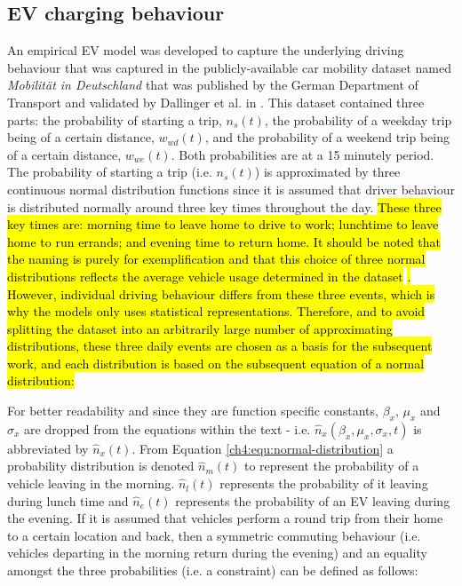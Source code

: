 \subsection{EV charging behaviour}
\label{ch4:subsec:ev-charging-behaviour}


An empirical EV model was developed to capture the underlying driving behaviour that was captured in the publicly-available car mobility dataset named \textit{Mobilit\"{a}t in Deutschland} that was published by the German Department of Transport \cite{MiD2008} and validated by Dallinger et al. in \cite{Dallinger2012}.
This dataset contained three parts: the probability of starting a trip, $n_{s}(t)$, the probability of a weekday trip being of a certain distance, $w_{wd}(t)$, and the probability of a weekend trip being of a certain distance, $w_{we}(t)$.
Both probabilities are at a 15 minutely period.
The probability of starting a trip (i.e. $n_{s}(t)$) is approximated by three continuous normal distribution functions since it is assumed that driver behaviour is distributed normally around three key times throughout the day.
\hl{These three key times are: morning time to leave home to drive to work; lunchtime to leave home to run errands; and evening time to return home.
It should be noted that the naming is purely for exemplification and that this choice of three normal distributions reflects the average vehicle usage determined in the dataset }\cite{MiD2008}\hl{.
However, individual driving behaviour differs from these three events, which is why the models only uses statistical representations.
Therefore, and to avoid splitting the dataset into an arbitrarily large number of approximating distributions, these three daily events are chosen as a basis for the subsequent work, and each distribution is based on the subsequent equation of a normal distribution:}



For better readability and since they are function specific constants, $\beta_x$, $\mu_x$ and $\sigma_x$ are dropped from the equations within the text - i.e. $\hat{n}_x(\beta_x,\mu_x,\sigma_x,t)$ is abbreviated by $\hat{n}_x(t)$.
From Equation \ref{ch4:equ:normal-distribution} a probability distribution is denoted $\hat{n}_{m}(t)$ to represent the probability of a vehicle leaving in the morning.
$\hat{n}_{l}(t)$ represents the probability of it leaving during lunch time and $\hat{n}_{e}(t)$ represents the probability of an EV leaving during the evening.
If it is assumed that vehicles perform a round trip from their home to a certain location and back, then a symmetric commuting behaviour (i.e. vehicles departing in the morning return during the evening) and an equality amongst the three probabilities (i.e. a constraint) can be defined as follows:

